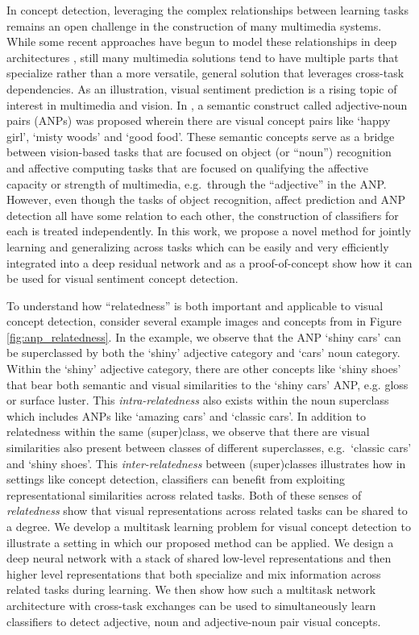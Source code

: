 \documentclass{sig-alternate-05-2015}
\begin{document}
In concept detection, leveraging the complex relationships between learning tasks remains an open challenge in the construction of many multimedia systems.
While some recent approaches have begun to model these relationships in deep architectures \cite{deng_2014,wu_2014}, still many multimedia solutions tend to have multiple parts that specialize rather than a more versatile, general solution that leverages cross-task dependencies.
As an illustration, visual sentiment prediction is a rising topic of interest in multimedia and vision.
In \cite{borth_2013}, a semantic construct called adjective-noun pairs (ANPs) was proposed wherein there are visual concept pairs like `happy girl', `misty woods' and `good food'.
These semantic concepts serve as a bridge between vision-based tasks that are focused on object (or ``noun'') recognition and affective computing tasks that are focused on qualifying the affective capacity or strength of multimedia, e.g.~through the ``adjective'' in the ANP.
However, even though the tasks of object recognition, affect prediction and ANP detection all have some relation to each other, the construction of classifiers for each is treated independently.
In this work, we propose a novel method for jointly learning and generalizing across tasks which can be easily and very efficiently integrated into a deep residual network and as a proof-of-concept show how it can be used for visual sentiment concept detection.

To understand how ``relatedness'' is both important and applicable to visual concept detection, consider several example images and concepts from \cite{borth_2013} in Figure \ref{fig:anp_relatedness}.
In the example, we observe that the ANP `shiny cars' can be superclassed by both the `shiny' adjective category and `cars' noun category.
Within the `shiny' adjective category, there are other concepts like `shiny shoes' that bear both semantic and visual similarities to the `shiny cars' ANP, e.g. gloss or surface luster.
This \emph{intra-relatedness} also exists within the noun superclass which includes ANPs like `amazing cars' and `classic cars'.
In addition to relatedness within the same (super)class, we observe that there are visual similarities also present between classes of different superclasses, e.g.~`classic cars' and `shiny shoes'.
This \emph{inter-relatedness} between (super)classes illustrates how in settings like concept detection, classifiers can benefit from exploiting representational similarities across related tasks.
Both of these senses of \emph{relatedness} show that visual representations across related tasks can be shared to a degree.
We develop a multitask learning problem for visual concept detection to illustrate a setting in which our proposed method can be applied.
We design a deep neural network with a stack of shared low-level representations and then higher level representations that both specialize and mix information across related tasks during learning.
We then show how such a multitask network architecture with cross-task exchanges can be used to simultaneously learn classifiers to detect adjective, noun and adjective-noun pair visual concepts.
\end{document}
